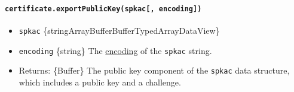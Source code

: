 \begin{Shaded}
\begin{Highlighting}[]
\OperatorTok{=} \NormalTok{(}\NormalTok{)}\OperatorTok{;}
\OperatorTok{=} \NormalTok{()}\OperatorTok{;}
\OperatorTok{=} \NormalTok{()}\OperatorTok{;}
\OperatorTok{=}\OperatorTok{;}
\NormalTok{(}\NormalTok{))}\OperatorTok{;}
\end{Highlighting}
\end{Shaded}

\paragraph{\texorpdfstring{\texttt{certificate.exportPublicKey(spkac{[},\ encoding{]})}}{certificate.exportPublicKey(spkac{[}, encoding{]})}}\label{certificate.exportpublickeyspkac-encoding}

\begin{itemize}
\tightlist
\item
  \texttt{spkac}
  \{string\textbar ArrayBuffer\textbar Buffer\textbar TypedArray\textbar DataView\}
\item
  \texttt{encoding} \{string\} The
  \href{buffer.md\#buffers-and-character-encodings}{encoding} of the
  \texttt{spkac} string.
\item
  Returns: \{Buffer\} The public key component of the \texttt{spkac}
  data structure, which includes a public key and a challenge.
\end{itemize}

\begin{Shaded}
\begin{Highlighting}[]
\OperatorTok{=}  \NormalTok{(}\NormalTok{)}\OperatorTok{;}
\OperatorTok{=} \NormalTok{()}\OperatorTok{;}
\OperatorTok{=} \NormalTok{()}\OperatorTok{;}
\OperatorTok{=}\OperatorTok{;}
\OperatorTok{;}
\end{Highlighting}
\end{Shaded}

